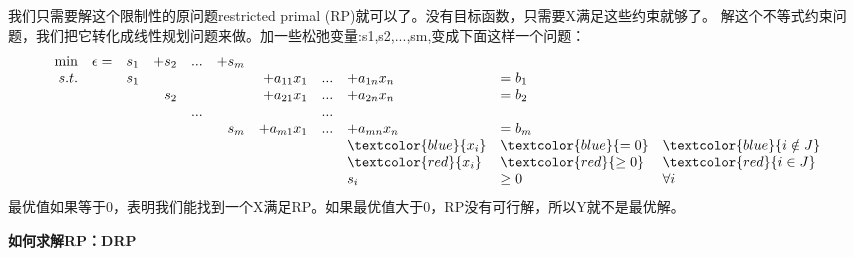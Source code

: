 我们只需要解这个限制性的原问题restricted primal (RP)就可以了。没有目标函数，只需要X满足这些约束就够了。
解这个不等式约束问题，我们把它转化成线性规划问题来做。加一些松弛变量:s1,s2,...,sm,变成下面这样一个问题：
\[
\begin{array}{rrrrrrrllllllllll}
 \min &\epsilon=&s_1    &+s_2   &...&+s_{m} &                   &    &                     &        & \\
 s.t.   &               &s_1    &           &   &            &+a_{11}x_1 &... &+a_{1n}x_{n} & =b_1 & \\
         &               &         &  s_2    &   &            &+a_{21}x_1 &... &+a_{2n}x_{n} & =b_2 & \\
         &               &         &           &...&            &                    &... &                     &          &\\
         &               &         &           &   & s_m    &+a_{m1}x_1 &... &+a_{mn}x_{n} & =b_m & \\
         &               &         &           &    &            &                         &   &\textcolor{blue}{x_i} & \textcolor{blue}{=  0}   &\textcolor{blue}{ i\notin J} \\
         &               &         &           &    &            &                         &    &\textcolor{red}{x_i}  &       \textcolor{red}{\geq  0}   & \textcolor{red}{i\in J} \\
         &               &         &           &     &            &                        &    &             s_i     & \geq 0 &  \forall i  \\
     \end{array} \nonumber
\]
最优值如果等于0，表明我们能找到一个X满足RP。如果最优值大于0，RP没有可行解，所以Y就不是最优解。


\textbf{如何求解RP：DRP}


